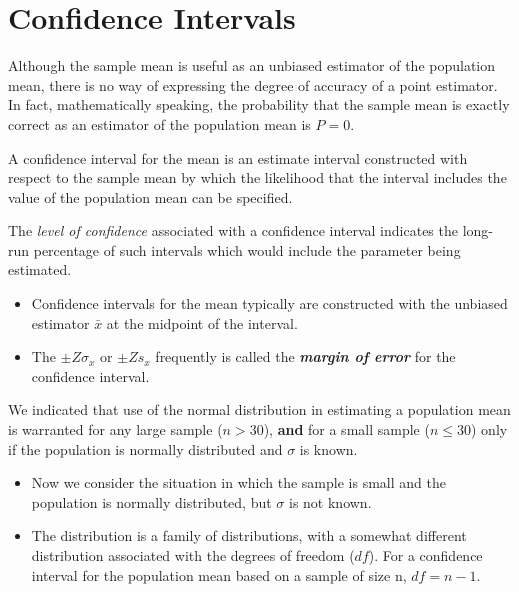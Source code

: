 \chapter{Confidence Intervals}
Although the sample mean is useful as an unbiased estimator of the population mean, there is no way of
expressing the degree of accuracy of a point estimator. In fact, mathematically speaking, the probability that the
sample mean is exactly correct as an estimator of the population mean is $P = 0$.

A confidence interval for the
mean is an estimate interval constructed with respect to the sample mean by which the likelihood that the interval
includes the value of the population mean can be specified.

The \emph{level of confidence} associated with a confidence interval indicates the long-run percentage
of such intervals which would include the parameter being estimated.




\begin{itemize}
\item Confidence intervals for the mean typically are constructed with the unbiased estimator $\bar{x}$ at the midpoint
of the interval.

\item The $\pm Z \sigma_x$ or $\pm Z s_x$ frequently is called the \textbf{\emph{margin of error}} for the confidence interval.
\end{itemize}
We indicated that use of the normal distribution in estimating a population mean is warranted
for any large sample ($n > 30$), \textbf{and} for a small sample ($n \leq 30$) only if the population is normally distributed
and $\sigma$ is known.

\begin{itemize}
\item Now we consider the situation in which the sample is small and the population is normally distributed,
but $\sigma$ is not known.
\item The distribution is a family of distributions, with
a somewhat different distribution associated with the degrees of freedom ($df$). For a confidence interval for the
population mean based on a sample of size n, $df = n - 1$.
\end{itemize}

